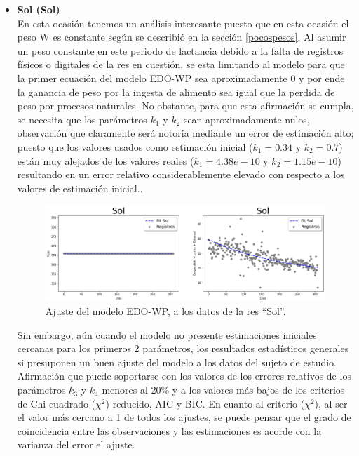 \begin{itemize}
    \item \textbf{Sol (Sol)}\\
    
    En esta ocasión tenemos un análisis interesante puesto que en esta ocasión el peso W es constante según se describió en la sección \ref{pocospesos}. Al asumir un peso constante en este periodo de lactancia debido a la falta de registros físicos o digitales de la res en cuestión, se esta limitando al modelo para que la primer ecuación del modelo EDO-WP sea aproximadamente 0 y por ende la ganancia de peso por la ingesta de alimento sea igual que la perdida de peso por procesos naturales. No obstante, para que esta afirmación se cumpla, se necesita que los parámetros $k_{1}$ y $k_{2}$ sean aproximadamente nulos, observación que claramente será notoria mediante un error de estimación alto; puesto que los valores usados como estimación inicial ($k_{1}=0.34$ y $k_{2}=0.7$) están muy alejados de los valores reales ($k_{1}=4.38e-10$ y $k_{2}=1.15e-10$) resultando en un error relativo considerablemente elevado con respecto a los valores de estimación inicial.. 
    
        \begin{figure}[H]
            \centering
            \includegraphics[scale=0.47]{img/ajustemodSol.png}
            \caption{Ajuste del modelo EDO-WP, a los datos de la res ``Sol''.}
            \label{ajustemodSolpng}
        \end{figure}

    Sin embargo, aún cuando el modelo no presente estimaciones iniciales cercanas para los primeros 2 parámetros, los resultados estadísticos generales si presuponen un buen ajuste del modelo a los datos del sujeto de estudio. Afirmación que puede soportarse con los valores de los errores relativos de los parámetros $k_{3}$ y $k_{4}$ menores al 20\% y a los valores más bajos de los criterios de Chi cuadrado ($\chi^{2}$) reducido, AIC y BIC. En cuanto al criterio ($\chi^{2}$), al ser el valor más cercano a 1 de todos los ajustes, se puede pensar que el grado de coincidencia entre las observaciones y las estimaciones es acorde con la varianza del error el ajuste.         


\end{itemize}
